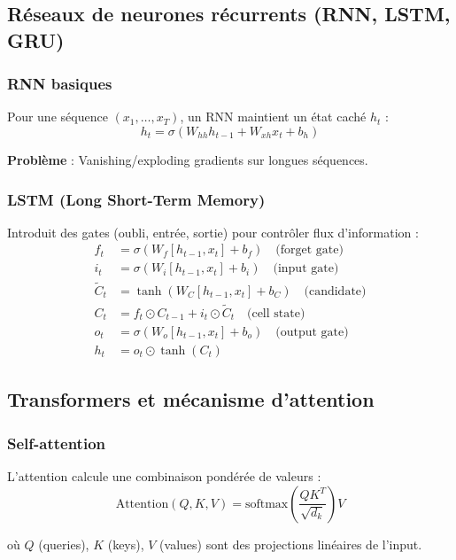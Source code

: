 \subsection{Réseaux de neurones récurrents (RNN, LSTM, GRU)}

\subsubsection{RNN basiques}

Pour une séquence $(x_1, \ldots, x_T)$, un RNN maintient un état caché $h_t$ :
\[
h_t = \sigma(W_{hh} h_{t-1} + W_{xh} x_t + b_h)
\]

\textbf{Problème} : Vanishing/exploding gradients sur longues séquences.

\subsubsection{LSTM (Long Short-Term Memory)}

Introduit des gates (oubli, entrée, sortie) pour contrôler flux d'information :
\begin{align*}
f_t &= \sigma(W_f [h_{t-1}, x_t] + b_f) \quad \text{(forget gate)} \\
i_t &= \sigma(W_i [h_{t-1}, x_t] + b_i) \quad \text{(input gate)} \\
\tilde{C}_t &= \tanh(W_C [h_{t-1}, x_t] + b_C) \quad \text{(candidate)} \\
C_t &= f_t \odot C_{t-1} + i_t \odot \tilde{C}_t \quad \text{(cell state)} \\
o_t &= \sigma(W_o [h_{t-1}, x_t] + b_o) \quad \text{(output gate)} \\
h_t &= o_t \odot \tanh(C_t)
\end{align*}

\subsection{Transformers et mécanisme d'attention}

\subsubsection{Self-attention}

L'attention calcule une combinaison pondérée de valeurs :
\[
\text{Attention}(Q, K, V) = \text{softmax}\left(\frac{QK^T}{\sqrt{d_k}}\right) V
\]

où $Q$ (queries), $K$ (keys), $V$ (values) sont des projections linéaires de l'input.

